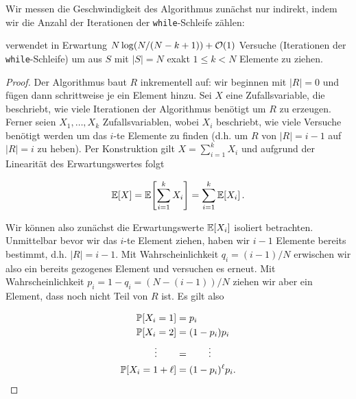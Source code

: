 \bigskip

Wir messen die Geschwindigkeit des Algorithmus zunächst nur indirekt, indem wir die Anzahl der Iterationen der \texttt{while}-Schleife zählen:

\begin{lemma}\label{lemma:basis-ziehen-ohne-zuruecklegen-versuche}
     verwendet in Erwartung $N \log(N/(N-k+1)) + \mathcal{O}\!\left(1\right)$ Versuche (Iterationen der \texttt{while}-Schleife) um aus $S$ mit $|S| = N$ exakt $1 \le k < N$ Elemente zu ziehen.
\end{lemma}

\begin{proof}
    Der Algorithmus baut $R$ inkrementell auf: wir beginnen mit $|R| = 0$ und fügen dann schrittweise je ein Element hinzu.
    Sei $X$ eine Zufallsvariable, die beschriebt, wie viele Iterationen der Algorithmus benötigt um $R$ zu erzeugen.
    Ferner seien $X_1, \ldots, X_k$ Zufallsvariablen, wobei $X_i$ beschriebt, wie viele Versuche benötigt werden um das $i$-te Elemente zu finden (d.h. um $R$ von $|R| = i - 1$ auf  $|R| = i$ zu heben).
    Per Konstruktion gilt $X = \sum_{i=1}^k X_i$ und aufgrund der Linearität des Erwartungswertes folgt

    \begin{equation}
        \mathbb{E}\!\left[X\right] = \mathbb{E}\!\left[\sum_{i=1}^k X_i\right] = \sum_{i=1}^k \mathbb{E}\!\left[X_i\right]. \label{eq:basis-ziehen-ohne-zuruecklegen_expvX}
    \end{equation}

    Wir können also zunächst die Erwartungswerte $\mathbb{E}\!\left[X_i\right]$ isoliert betrachten.
    Unmittelbar bevor wir das $i$-te Element ziehen, haben wir $i-1$ Elemente bereits bestimmt, d.h. $|R| = i - 1$.
    Mit Wahrscheinlichkeit $q_i = (i-1) / N$ erwischen wir also ein bereits gezogenes Element und versuchen es erneut.
    Mit Wahrscheinlichkeit $p_i = 1 - q_i = (N - (i - 1)) / N$ ziehen wir aber ein Element, dass noch nicht Teil von $R$ ist.
    Es gilt also

    \begin{align*}
        \mathbb{P}\!\left[X_i = 1\right]            & = p_i                  \\
        \mathbb{P}\!\left[X_i = 2\right]            & = (1 -p_i) p_i         \\
        \vdots         \quad\quad & = \quad\quad \vdots    \\
        \mathbb{P}\!\left[X_i = 1 + \ell\right]     & = (1- p_i)^{\ell} p_i.
    \end{align*}


\end{proof}
